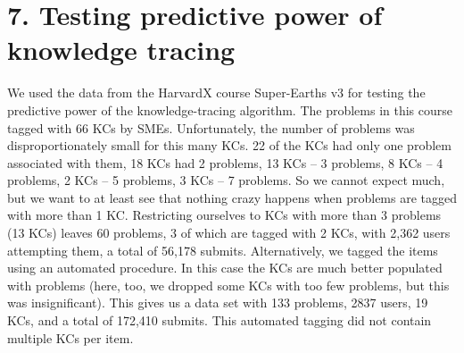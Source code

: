 \documentclass{sigchi}
\newcommand{\1}{\mathbf{1}}
\begin{document}
% 
% 


\section{7. Testing predictive power of knowledge tracing}
We used the data from the HarvardX course Super-Earths v3 for testing the predictive power of the knowledge-tracing algorithm. The problems in this course tagged with 66 KCs by SMEs. Unfortunately, the number of problems was disproportionately small for this many KCs. 22 of the KCs had only one problem associated with them, 18 KCs had 2 problems, 13 KCs -- 3 problems, 8 KCs -- 4 problems, 2 KCs -- 5 problems, 3 KCs -- 7 problems. So we cannot expect much, but we want to at least see that nothing crazy happens when problems are tagged with more than 1 KC. Restricting ourselves to KCs with more than 3 problems (13 KCs) leaves 60 problems, 3 of which are tagged with 2 KCs, with 2,362 users attempting them, a total of 56,178 submits. Alternatively, we tagged the items using an automated procedure. In this case the KCs are much better populated with problems (here, too, we dropped some KCs with too few problems, but this was insignificant). This gives us a data set with 133 problems, 2837 users, 19 KCs, and a total of 172,410 submits. This automated tagging did not contain multiple KCs per item.
\end{document}

